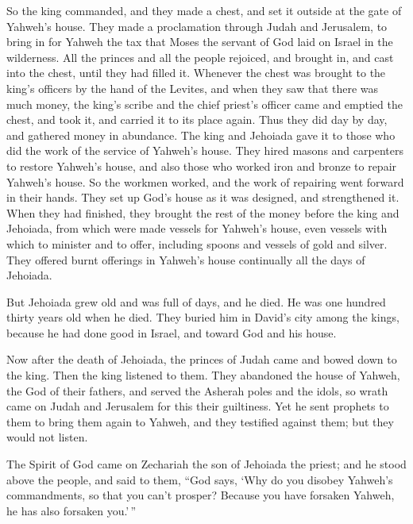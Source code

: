 \begin{paracol}{2}
\begin{otherlanguage}{english}
 So the king commanded, and they made a chest, and set it
outside at the gate of Yahweh's house.  They made a
proclamation through Judah and Jerusalem, to bring in for Yahweh the tax
that Moses the servant of God laid on Israel in the wilderness.
 All the princes and all the people rejoiced, and brought
in, and cast into the chest, until they had filled it. 
Whenever the chest was brought to the king's officers by the hand of the
Levites, and when they saw that there was much money, the king's scribe
and the chief priest's officer came and emptied the chest, and took it,
and carried it to its place again. Thus they did day by day, and
gathered money in abundance.  The king and Jehoiada gave
it to those who did the work of the service of Yahweh's house. They
hired masons and carpenters to restore Yahweh's house, and also those
who worked iron and bronze to repair Yahweh's house.  So
the workmen worked, and the work of repairing went forward in their
hands. They set up God's house as it was designed, and strengthened it.
 When they had finished, they brought the rest of the
money before the king and Jehoiada, from which were made vessels for
Yahweh's house, even vessels with which to minister and to offer,
including spoons and vessels of gold and silver. They offered burnt
offerings in Yahweh's house continually all the days of Jehoiada.

 But Jehoiada grew old and was full of days, and he died.
He was one hundred thirty years old when he died.  They
buried him in David's city among the kings, because he had done good in
Israel, and toward God and his house.

 Now after the death of Jehoiada, the princes of Judah
came and bowed down to the king. Then the king listened to them.
 They abandoned the house of Yahweh, the God of their
fathers, and served the Asherah poles and the idols, so wrath came on
Judah and Jerusalem for this their guiltiness.  Yet he
sent prophets to them to bring them again to Yahweh, and they testified
against them; but they would not listen.

 The Spirit of God came on Zechariah the son of Jehoiada
the priest; and he stood above the people, and said to them, ``God says,
`Why do you disobey Yahweh's commandments, so that you can't prosper?
Because you have forsaken Yahweh, he has also forsaken you.'\,''


\end{otherlanguage}
\end{paracol}
